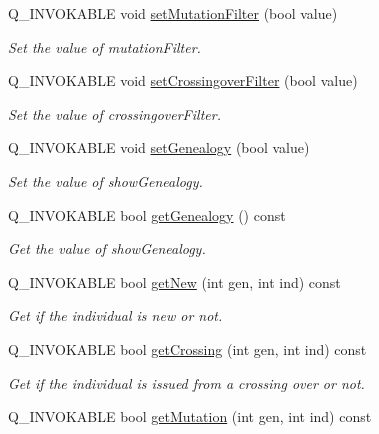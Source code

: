 \begin{DoxyCompactItemize}
Q\+\_\+\+I\+N\+V\+O\+K\+A\+B\+LE void \hyperlink{class_population_table_model_a626b38549b3b6584101d12a33e6ca0b7}{set\+Mutation\+Filter} (bool value)
\begin{DoxyCompactList}\small\item\em Set the value of mutation\+Filter. \end{DoxyCompactList}\item 
Q\+\_\+\+I\+N\+V\+O\+K\+A\+B\+LE void \hyperlink{class_population_table_model_ab599045f346cdd662abb37d464abfb41}{set\+Crossingover\+Filter} (bool value)
\begin{DoxyCompactList}\small\item\em Set the value of crossingover\+Filter. \end{DoxyCompactList}\item 
Q\+\_\+\+I\+N\+V\+O\+K\+A\+B\+LE void \hyperlink{class_population_table_model_a04993b940f7f6950491caf84835c3318}{set\+Genealogy} (bool value)
\begin{DoxyCompactList}\small\item\em Set the value of show\+Genealogy. \end{DoxyCompactList}\item 
Q\+\_\+\+I\+N\+V\+O\+K\+A\+B\+LE bool \hyperlink{class_population_table_model_a935108bb7a97dab519fc437a67c11d26}{get\+Genealogy} () const
\begin{DoxyCompactList}\small\item\em Get the value of show\+Genealogy. \end{DoxyCompactList}\item 
Q\+\_\+\+I\+N\+V\+O\+K\+A\+B\+LE bool \hyperlink{class_population_table_model_aa9c8b5f91e1da0c1e634fd01c1d2c4bf}{get\+New} (int gen, int ind) const
\begin{DoxyCompactList}\small\item\em Get if the individual is new or not. \end{DoxyCompactList}\item 
Q\+\_\+\+I\+N\+V\+O\+K\+A\+B\+LE bool \hyperlink{class_population_table_model_a0b3905d7e1fc17abc89551439bcdd646}{get\+Crossing} (int gen, int ind) const
\begin{DoxyCompactList}\small\item\em Get if the individual is issued from a crossing over or not. \end{DoxyCompactList}\item 
Q\+\_\+\+I\+N\+V\+O\+K\+A\+B\+LE bool \hyperlink{class_population_table_model_aed9a2f2273e32671be1fabcf7050620f}{get\+Mutation} (int gen, int ind) const

\end{DoxyCompactItemize}
